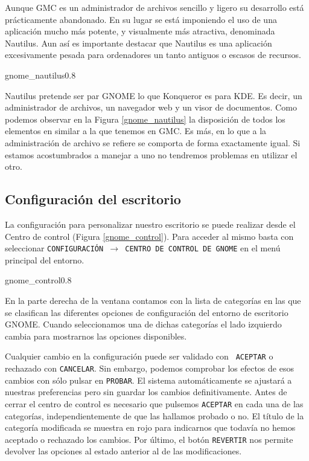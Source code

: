 Aunque {\sf  GMC} es  un administrador de  archivos sencillo  y ligero
su  desarrollo está  prácticamente  abandonado. En  su  lugar se  está
imponiendo el uso  de una aplicación mucho más  potente, y visualmente
más  atractiva,  denominada  {\sf  Nautilus}. Aun  así  es  importante
destacar  que {\sf  Nautilus} es  una aplicación  excesivamente pesada
para ordenadores un tanto antiguos o escasos de recursos.

\begin{figura}{gnome_nautilus}{0.8}
\caption{Administrador de archivos Nautilus}
\label{gnome_nautilus}
\end{figura}

{\sf Nautilus} pretende ser par {\sf  GNOME} lo que {\sf Konqueror} es
para {\sf KDE}.  Es decir, un administrador de  archivos, un navegador
web  y un  visor de  documentos. Como  podemos observar  en la  Figura
\ref{gnome_nautilus} la disposición de  todos los elementos en similar
a la que tenemos  en {\sf GMC}. Es más, en lo  que a la administración
de  archivo se  refiere se  comporta  de forma  exactamente igual.  Si
estamos  acostumbrados  a manejar  a  uno  no tendremos  problemas  en
utilizar el otro.

\subsection{Configuración del escritorio}

La  configuración  para  personalizar   nuestro  escritorio  se  puede
realizar  desde  el  {\sf  Centro  de  control} (Figura \ref{gnome_control}). Para acceder al mismo basta con
seleccionar  {\tt CONFIGURACIÓN  $\rightarrow$  CENTRO  DE CONTROL  DE
GNOME} en el menú principal del entorno.

\begin{figura}{gnome_control}{0.8}
\caption{Centro de control GNOME}
\label{gnome_control}
\end{figura}

En la parte derecha de la  ventana contamos con la lista de categorías
en las que se clasifican  las diferentes opciones de configuración del
entorno de escritorio {\sf GNOME}.  Cuando seleccionamos una de dichas
categorías  el  lado izquierdo  cambia  para  mostrarnos las  opciones
disponibles.

Cualquier  cambio en  la  configuración puede  ser  validado con  {\tt
ACEPTAR}  o  rechazado  con   {\tt  CANCELAR}.  Sin  embargo,  podemos
comprobar los efectos de esos cambios con sólo pulsar en {\tt PROBAR}.
El sistema  automáticamente se  ajustará a nuestras  preferencias pero
sin guardar los cambios definitivamente.  Antes de cerrar el centro de
control es  necesario que pulsemos  {\tt ACEPTAR}  en cada una  de las
categorías, independientemente  de que las  hallamos probado o  no. El
título de la  categoría modificada se muestra en  rojo para indicarnos
que todavía no hemos aceptado o  rechazado los cambios. Por último, el
botón  {\tt REVERTIR}  nos  permite devolver  las  opciones al  estado
anterior al de las modificaciones.

